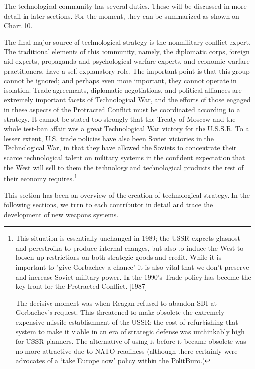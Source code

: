 The technological community has several duties. These will be discussed in more detail in later sections. For the moment, they can be summarized as shown on Chart 10.

The final major source of technological strategy is the nonmilitary conflict expert. The traditional elements of this community, namely, the diplomatic corps, foreign aid experts, propaganda and psychological warfare experts, and economic warfare practitioners, have a self-explanatory role. The important point is that this group cannot be ignored; and perhaps even more important, they cannot operate in isolation. Trade agreements, diplomatic negotiations, and political alliances are extremely important facets of Technological War, and the efforts of those engaged in these aspects of the Protracted Conflict must be coordinated according to a strategy. It cannot be stated too strongly that the Treaty of Moscow and the whole test-ban affair was a great Technological War victory for the U.S.S.R. To a lesser extent, U.S. trade policies have also been Soviet victories in the Technological War, in that they have allowed the Soviets to concentrate their scarce technological talent on military systems in the confident expectation that the West will sell to them the technology and technological products the rest of their economy requires.\footnote{This situation is essentially unchanged in 1989; the USSR expects glasnost and perestroika to produce internal changes, but also to induce the West to loosen up restrictions on both strategic goods and credit. While it is important to "give Gorbachev a chance" it is also vital that we don't preserve and increase Soviet military power. In the 1990's Trade policy has become the key front for the Protracted Conflict. [1987]

The decisive moment was when Reagan refused to abandon SDI at Gorbachev’s request. This threatened to make obsolete the extremely expensive missile establishment of the USSR; the cost of refurbishing that system to make it viable in an era of strategic defense was unthinkably high for USSR planners. The alternative of using it before it became obsolete was no more attractive due to NATO readiness (although there certainly were advocates of a ‘take Europe now’ policy within the PolitBuro.)}

This section has been an overview of the creation of technological strategy. In the following sections, we turn to each contributor in detail and trace the development of new weapons systems.

